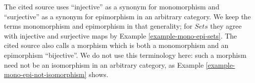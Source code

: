 \begin{history}
The cited source uses ``injective'' as a synonym for monomorphism and
``surjective'' as a synonym for epimorphism in an arbitrary category.
We keep the terms monomorphism and epimorphism in that generality; for
$\textit{Sets}$ they agree with injective and surjective maps by
Example \ref{example-mono-epi-sets}.
The cited source also calls a morphism which is both a monomorphism and an
epimorphism ``bijective''. We do not use this terminology here: such a
morphism need not be an isomorphism in an arbitrary category, as
Example \ref{example-mono-epi-not-isomorphism} shows.
\end{history}
